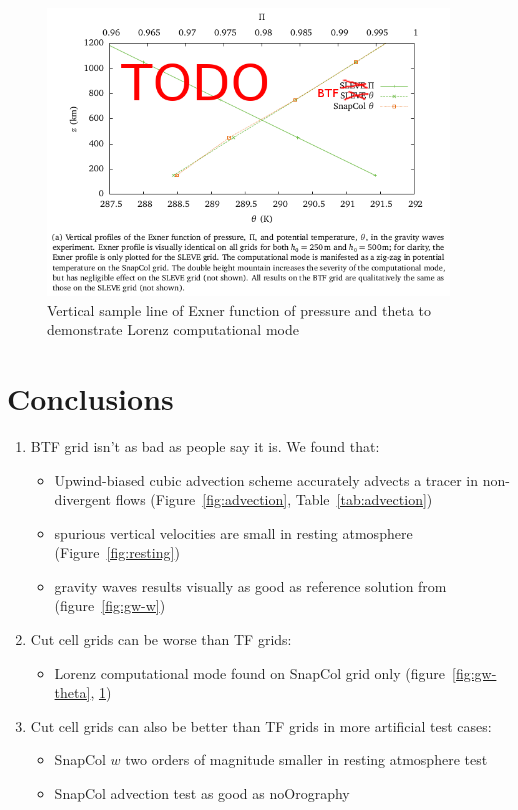 \documentclass{ametsoc}
\begin{document}
\begin{figure}
	\includegraphics[height=3in]{gw-exner-theta.png}
%
	\caption{Vertical sample line of Exner function of pressure and theta to demonstrate Lorenz computational mode}
	\label{fig:gw-exner-theta}
\end{figure}


\section{Conclusions}
\begin{enumerate}
	\item BTF grid isn't as bad as people say it is.  We found that:
	\begin{itemize}
		\item Upwind-biased cubic advection scheme accurately advects a tracer in non-divergent flows (Figure~\ref{fig:advection}, Table~\ref{tab:advection})
		\item spurious vertical velocities are small in resting atmosphere (Figure~\ref{fig:resting})
		\item gravity waves results visually as good as reference solution from \textcite{melvin2010} (figure~\ref{fig:gw-w})
	\end{itemize}

	\item Cut cell grids can be worse than TF grids:
	\begin{itemize}
		\item Lorenz computational mode found on SnapCol grid only (figure~\ref{fig:gw-theta}, \ref{fig:gw-exner-theta})
	\end{itemize}

	\item Cut cell grids can also be better than TF grids in more artificial test cases:
	\begin{itemize}
		\item SnapCol $w$ two orders of magnitude smaller in resting atmosphere test
		\item SnapCol advection test as good as noOrography
	\end{itemize}
\end{enumerate}
\end{document}
